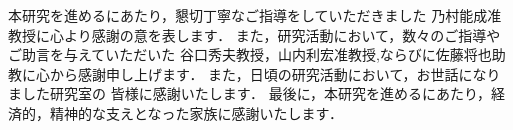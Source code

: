 \documentclass[tanilab-enum]{graduate}
\begin{document}
\acknowledgment\label{acknowledgement} %


本研究を進めるにあたり，懇切丁寧なご指導をしていただきました
乃村能成准教授に心より感謝の意を表します．
また，研究活動において，数々のご指導やご助言を与えていただいた
谷口秀夫教授，山内利宏准教授,ならびに佐藤将也助教に心から感謝申し上げます．
また，日頃の研究活動において，お世話になりました研究室の
皆様に感謝いたします．
最後に，本研究を進めるにあたり，経済的，精神的な支えとなった家族に感謝いたします．





\end{document}
